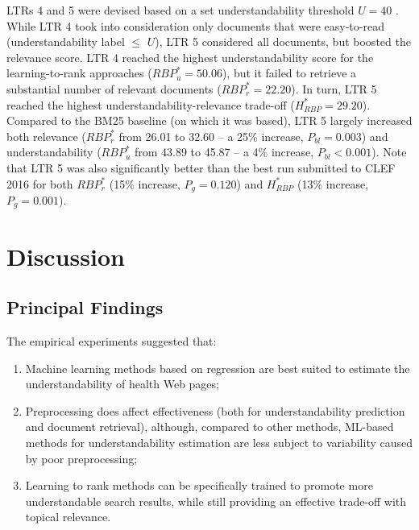 \documentclass[10pt,a4paper]{article}
\begin{document}
LTRs 4 and 5 were devised based on a set understandability threshold $U=40$ . While LTR 4 took into consideration only documents that were easy-to-read (understandability label $\le$ $U$), LTR 5 considered all documents, but boosted the relevance score. LTR 4 reached the highest understandability score for the learning-to-rank approaches ($RBP_u^{*}=50.06$), but it failed to retrieve a substantial number of relevant documents ($RBP_r^{*}=22.20$). In turn, LTR 5 reached the highest
understandability-relevance trade-off ($H_{RBP}^{*}=29.20$). Compared to the BM25 baseline (on which it was based), LTR 5  largely increased both relevance ($RBP_r^*$ from 26.01 to 32.60 -- a 25\% increase, $P_{bl}=0.003$) and understandability ($RBP_u^*$ from 43.89 to 45.87 -- a 4\% increase, $P_{bl}<0.001$). Note that LTR 5 was also significantly better than the best run submitted to CLEF 2016 for both $RBP_r^{*}$ (15\% increase, $P_{g}=0.120$) and $H_{RBP}^{*}$ (13\% increase, $P_{g}=0.001$).




\section*{Discussion}

\subsection*{Principal Findings}

The empirical experiments suggested that:

\vspace{-4pt}
\begin{enumerate}[leftmargin=*]
	\item Machine learning methods based on regression are best suited to estimate the understandability of health Web pages;
	\item Preprocessing does affect effectiveness (both for understandability prediction and document retrieval), although, compared to other methods, ML-based methods for understandability estimation are less subject to variability caused by poor preprocessing;
	\item Learning to rank methods can be specifically trained to promote more understandable search results, while still providing an effective trade-off with topical relevance.
\end{enumerate} 
\end{document}
